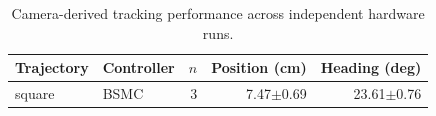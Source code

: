 \begin{table}[!t]
\centering
\caption{Camera-derived tracking performance across independent hardware runs.}
\label{tab:tracking}
\begin{tabular}{llrrr}
\hline
Trajectory & Controller & $n$ & Position (cm) & Heading (deg) \\
\hline
square & BSMC & 3 & 7.47$\pm$0.69 & 23.61$\pm$0.76 \\
\hline
\end{tabular}
\end{table}
